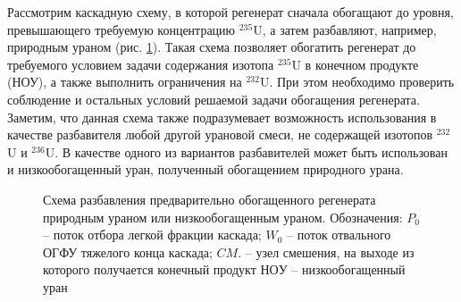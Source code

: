 Рассмотрим каскадную схему, в которой регенерат сначала обогащают до уровня, превышающего требуемую концентрацию $^{235}$U, а затем разбавляют, например, природным ураном (рис. \ref{o1}). Такая схема позволяет обогатить регенерат до требуемого условием задачи содержания изотопа $^{235}$U в конечном продукте (НОУ), а также выполнить ограничения на $^{232}$U. При этом необходимо проверить соблюдение и остальных условий решаемой задачи обогащения регенерата. Заметим, что данная схема также подразумевает возможность использования в качестве разбавителя любой другой урановой смеси, не содержащей изотопов $^{232}$U и $^{236}$U. В качестве одного из вариантов разбавителей может быть использован и низкообогащенный уран, полученный обогащением природного урана.

\begin{figure}[ht]
  \caption{Схема разбавления предварительно обогащенного регенерата природным ураном или низкообогащенным ураном. Обозначения: $P_0$ -- поток отбора легкой фракции каскада; $W_0$ -- поток отвального ОГФУ тяжелого конца каскада; $CM.$ -- узел смешения, на выходе из которого получается конечный продукт $НОУ$ -- низкообогащенный уран}\label{o1}
\end{figure}


